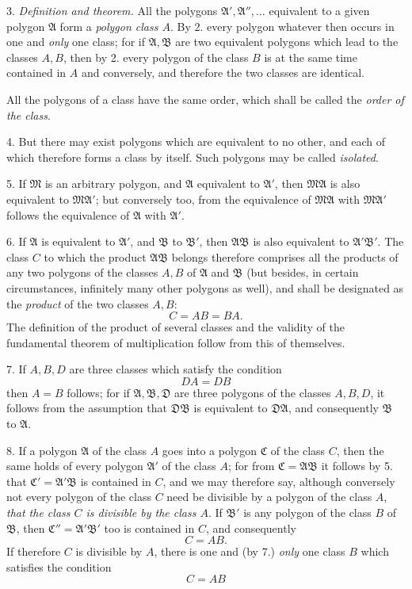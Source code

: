 \documentclass{article}
\begin{document}
3. \emph{Definition and theorem.} All the polygons $\mathfrak{A}', \mathfrak{A}'', \ldots$ equivalent to a given polygon $\mathfrak{A}$ form a \emph{polygon class $A$}. By 2. every polygon whatever then occurs in one and \emph{only} one class; for if $\mathfrak{A}, \mathfrak{B}$ are two equivalent polygons which lead to the classes $A, B$, then by 2. every polygon of the class $B$ is at the same time contained in $A$ and conversely, and therefore the two classes are identical.

All the polygons of a class have the same order, which shall be called the \emph{order of the class}.

4. But there may exist polygons which are equivalent to no other, and each of which therefore forms a class by itself. Such polygons may be called \emph{isolated}.

5. If $\mathfrak{M}$ is an arbitrary polygon, and $\mathfrak{A}$ equivalent to $\mathfrak{A}'$, then $\mathfrak{M}\mathfrak{A}$ is also equivalent to $\mathfrak{M}\mathfrak{A}'$; but conversely too, from the equivalence of $\mathfrak{M}\mathfrak{A}$ with $\mathfrak{M}\mathfrak{A}'$ follows the equivalence of $\mathfrak{A}$ with $\mathfrak{A}'$.

6. If $\mathfrak{A}$ is equivalent to $\mathfrak{A}'$, and $\mathfrak{B}$ to $\mathfrak{B}'$, then $\mathfrak{A}\mathfrak{B}$ is also equivalent to $\mathfrak{A}'\mathfrak{B}'$. The class $C$ to which the product $\mathfrak{A}\mathfrak{B}$ belongs therefore comprises all the products of any two polygons of the classes $A, B$ of $\mathfrak{A}$ and $\mathfrak{B}$ (but besides, in certain circumstances, infinitely many other polygons as well), and shall be designated as the \emph{product} of the two classes $A, B$:
\[ C = AB = BA. \]
The definition of the product of several classes and the validity of the fundamental theorem of multiplication follow from this of themselves.

7. If $A, B, D$ are three classes which satisfy the condition
\[ DA = DB \]
then $A = B$ follows; for if $\mathfrak{A}, \mathfrak{B}, \mathfrak{D}$ are three polygons of the classes $A, B, D$, it follows from the assumption that $\mathfrak{D}\mathfrak{B}$ is equivalent to $\mathfrak{D}\mathfrak{A}$, and consequently $\mathfrak{B}$ to $\mathfrak{A}$.


8. If a polygon $\mathfrak{A}$ of the class $A$ goes into a polygon $\mathfrak{C}$ of the class $C$, then the same holds of every polygon $\mathfrak{A}'$ of the class $A$; for from $\mathfrak{C} = \mathfrak{A}\mathfrak{B}$ it follows by 5. that $\mathfrak{C}' = \mathfrak{A}'\mathfrak{B}$ is contained in $C$, and we may therefore say, although conversely not every polygon of the class $C$ need be divisible by a polygon of the class $A$, \emph{that the class $C$ is divisible by the class $A$}. If $\mathfrak{B}'$ is any polygon of the class $B$ of $\mathfrak{B}$, then $\mathfrak{C}'' = \mathfrak{A}'\mathfrak{B}'$ too is contained in $C$, and consequently
\[ C = AB. \]
If therefore $C$ is divisible by $A$, there is one and (by 7.) \emph{only} one class $B$ which satisfies the condition
\[ C = AB \]
\end{document}
